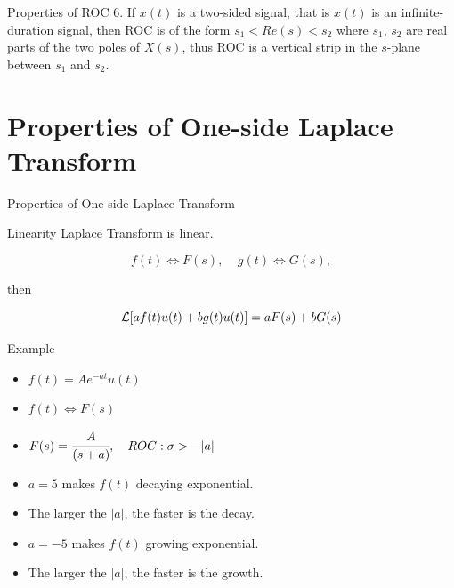 \documentclass[aspectratio=169,xcolor=dvipsnames,svgnames,x11names,fleqn]{beamer}
\begin{document}
\begin{frame}{Properties of ROC}
    6. If $x(t)$ is a two-sided signal, that is $x(t)$ is an infinite-duration signal, then ROC is of the form $s_1 < Re(s) < s_2$ where $s_1$, $s_2$ are real parts of the two poles of $X(s)$, thus ROC is a vertical strip in the $s$-plane between $s_1$ and $s_2$.

\end{frame}


\section{Properties of One-side Laplace Transform
}


\begin{frame}{}
    \begin{center}
    \Huge \bf \color{DarkBlue}
   \faAreaChart
    
   Properties of One-side Laplace Transform



\end{center}
\end{frame}

\begin{frame}{Linearity}
    Laplace Transform is linear.

$$
f(t) \iff F(s),~~~~~g(t)\iff G(s), 
$$

then

$$
{\mathcal L} [a f(t)u(t) + b g(t)u(t)] = aF(s) + bG(s)
$$
\end{frame}

\begin{frame}{Example}

\begin{itemize}
    \item 

   $ f (t) = Ae^{-at}u(t)$

\item $f(t) \iff F(s)$

\item $F(s) = \cfrac{A}{(s+a)} ,\quad  ROC: \sigma  > -|a|$

\item $a = 5$ makes $f(t)$ decaying exponential.

\item The larger the $|a|$, the faster is the decay.

\item $a = -5$ makes $f(t)$ growing exponential. 

\item The larger the $|a|$, the faster is the growth.

\end{itemize}
\end{frame}
\end{document}
